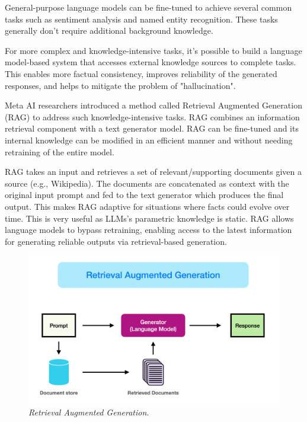 General-purpose language models can be fine-tuned to achieve several common tasks such as sentiment analysis and named entity recognition. These tasks generally don't require additional background knowledge.

For more complex and knowledge-intensive tasks, it's possible to build a language model-based system that accesses external knowledge sources to complete tasks. This enables more factual consistency, improves reliability of the generated responses, and helps to mitigate the problem of "hallucination".

Meta AI researchers introduced a method called Retrieval Augmented Generation (RAG) \cite{metaairag}  to address such knowledge-intensive tasks. RAG combines an information retrieval component with a text generator model. RAG can be fine-tuned and its internal knowledge can be modified in an efficient manner and without needing retraining of the entire model.

RAG takes an input and retrieves a set of relevant/supporting documents given a source (e.g., Wikipedia). The documents are concatenated as context with the original input prompt and fed to the text generator which produces the final output. This makes RAG adaptive for situations where facts could evolve over time. This is very useful as LLMs's parametric knowledge is static. RAG allows language models to bypass retraining, enabling access to the latest information for generating reliable outputs via retrieval-based generation.

\begin{figure}[H]
    \centering
    \includegraphics[width=\linewidth]{rag.png}
    \caption{\it{Retrieval Augmented Generation.}}
    \label{fig:rag}
\end{figure}

